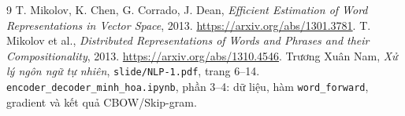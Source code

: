 \documentclass[12pt,a4paper]{article}
\begin{document}
\begin{thebibliography}{9}
 T. Mikolov, K. Chen, G. Corrado, J. Dean, \emph{Efficient Estimation of Word Representations in Vector Space}, 2013. \url{https://arxiv.org/abs/1301.3781}.
 T. Mikolov et al., \emph{Distributed Representations of Words and Phrases and their Compositionality}, 2013. \url{https://arxiv.org/abs/1310.4546}.
 Trương Xuân Nam, \emph{Xử lý ngôn ngữ tự nhiên}, \texttt{slide/NLP-1.pdf}, trang 6--14.
 \texttt{encoder\_decoder\_minh\_hoa.ipynb}, phần 3--4: dữ liệu, hàm \texttt{word\_forward}, gradient và kết quả CBOW/Skip-gram.
\end{thebibliography}
\end{document}
